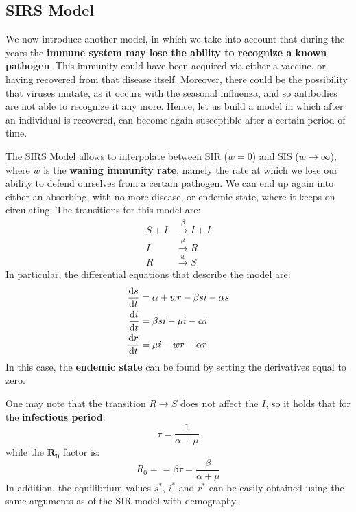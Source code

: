 \documentclass[../main/main.tex]{subfiles}
\begin{document}


\subsection{SIRS Model}
We now introduce another model, in which we take into account that during the years the \textbf{immune system may lose the ability to recognize a known pathogen}. This immunity could have been acquired via either a vaccine, or having recovered from that disease itself. Moreover, there could be the possibility that viruses mutate, as it occurs with the seasonal influenza, and so antibodies are not able to recognize it any more. Hence, let us build a model in which after an individual is recovered, can become again susceptible after a certain period of time.

The SIRS Model allows to interpolate between SIR (\( w=0 \)) and SIS (\( w \rightarrow \infty  \)), where $w$ is the \textbf{waning immunity rate}, namely the rate at which we lose our ability to defend ourselves from a certain pathogen. We can end up again into either an absorbing, with no more disease, or endemic state, where it keeps on circulating.
The transitions for this model are:
\begin{equation}
\begin{split}
 S + I &\overset{\beta }{\rightarrow } I + I   \\
 I & \overset{\mu }{\rightarrow } R  \\
 R & \overset{w}{\rightarrow } S
\end{split}
\end{equation}
In particular, the differential equations that describe the model are:
\begin{equation}
  \begin{split}
    \dv{s}{t} &= \alpha + w r - \beta  s i - \alpha s \\
  \dv{i}{t} &= \beta s i - \mu i - \alpha i \\
  \dv{r}{t} &= \mu i - w r - \alpha r
\end{split}
\end{equation}
In this case, the \textbf{endemic state} can be found by setting the derivatives equal to zero.

One may note that the transition \( R \rightarrow S \) does not affect the \( I \), so it holds that for the \textbf{infectious period}:
\begin{equation}
  \tau = \frac{1}{\alpha + \mu }
\end{equation}
while the $ \mathbf{R_0} $ factor is:
\begin{equation}
  R_0 = = \beta \tau = \frac{\beta }{\alpha + \mu }
\end{equation}
In addition, the equilibrium values \( s^* \), \( i^* \) and \( r^* \) can be easily obtained using the same arguments as of the SIR model with demography.
\end{document}
